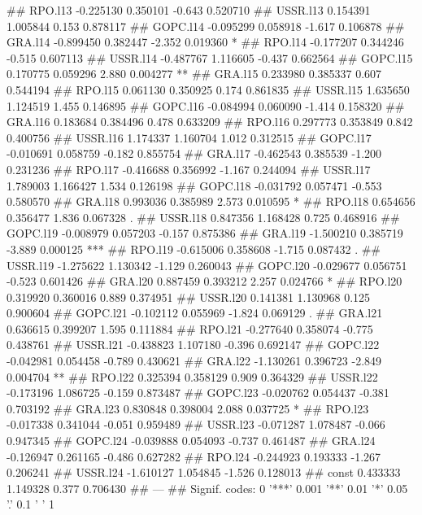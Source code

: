 \documentclass[
]{article}
\begin{document}
\begin{itemize}
## RPO.l13  -0.225130   0.350101  -0.643 0.520710    
## USSR.l13  0.154391   1.005844   0.153 0.878117    
## GOPC.l14 -0.095299   0.058918  -1.617 0.106878    
## GRA.l14  -0.899450   0.382447  -2.352 0.019360 *  
## RPO.l14  -0.177207   0.344246  -0.515 0.607113    
## USSR.l14 -0.487767   1.116605  -0.437 0.662564    
## GOPC.l15  0.170775   0.059296   2.880 0.004277 ** 
## GRA.l15   0.233980   0.385337   0.607 0.544194    
## RPO.l15   0.061130   0.350925   0.174 0.861835    
## USSR.l15  1.635650   1.124519   1.455 0.146895    
## GOPC.l16 -0.084994   0.060090  -1.414 0.158320    
## GRA.l16   0.183684   0.384496   0.478 0.633209    
## RPO.l16   0.297773   0.353849   0.842 0.400756    
## USSR.l16  1.174337   1.160704   1.012 0.312515    
## GOPC.l17 -0.010691   0.058759  -0.182 0.855754    
## GRA.l17  -0.462543   0.385539  -1.200 0.231236    
## RPO.l17  -0.416688   0.356992  -1.167 0.244094    
## USSR.l17  1.789003   1.166427   1.534 0.126198    
## GOPC.l18 -0.031792   0.057471  -0.553 0.580570    
## GRA.l18   0.993036   0.385989   2.573 0.010595 *  
## RPO.l18   0.654656   0.356477   1.836 0.067328 .  
## USSR.l18  0.847356   1.168428   0.725 0.468916    
## GOPC.l19 -0.008979   0.057203  -0.157 0.875386    
## GRA.l19  -1.500210   0.385719  -3.889 0.000125 ***
## RPO.l19  -0.615006   0.358608  -1.715 0.087432 .  
## USSR.l19 -1.275622   1.130342  -1.129 0.260043    
## GOPC.l20 -0.029677   0.056751  -0.523 0.601426    
## GRA.l20   0.887459   0.393212   2.257 0.024766 *  
## RPO.l20   0.319920   0.360016   0.889 0.374951    
## USSR.l20  0.141381   1.130968   0.125 0.900604    
## GOPC.l21 -0.102112   0.055969  -1.824 0.069129 .  
## GRA.l21   0.636615   0.399207   1.595 0.111884    
## RPO.l21  -0.277640   0.358074  -0.775 0.438761    
## USSR.l21 -0.438823   1.107180  -0.396 0.692147    
## GOPC.l22 -0.042981   0.054458  -0.789 0.430621    
## GRA.l22  -1.130261   0.396723  -2.849 0.004704 ** 
## RPO.l22   0.325394   0.358129   0.909 0.364329    
## USSR.l22 -0.173196   1.086725  -0.159 0.873487    
## GOPC.l23 -0.020762   0.054437  -0.381 0.703192    
## GRA.l23   0.830848   0.398004   2.088 0.037725 *  
## RPO.l23  -0.017338   0.341044  -0.051 0.959489    
## USSR.l23 -0.071287   1.078487  -0.066 0.947345    
## GOPC.l24 -0.039888   0.054093  -0.737 0.461487    
## GRA.l24  -0.126947   0.261165  -0.486 0.627282    
## RPO.l24  -0.244923   0.193333  -1.267 0.206241    
## USSR.l24 -1.610127   1.054845  -1.526 0.128013    
## const     0.433333   1.149328   0.377 0.706430    
## ---
## Signif. codes:  0 '***' 0.001 '**' 0.01 '*' 0.05 '.' 0.1 ' ' 1

\end{itemize}
\end{document}
